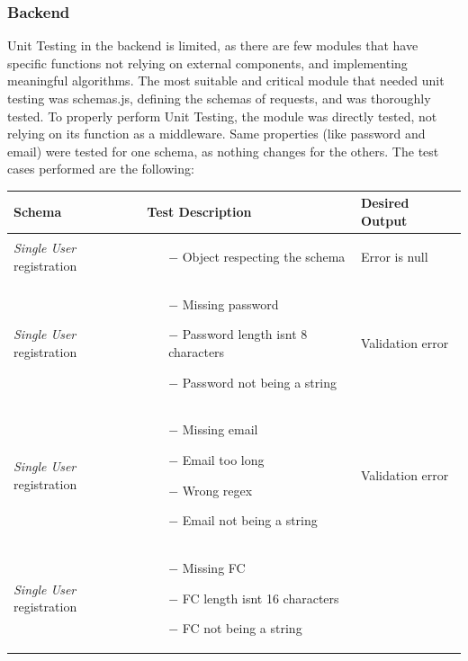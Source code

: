 \documentclass[titlepage]{article}
\begin{document}
	\subsubsection{Backend}
	Unit Testing in the backend is limited, as there are few modules that have specific functions not relying on external components, and implementing meaningful algorithms. 
	The most suitable and critical module that needed unit testing was schemas.js, defining the schemas of requests, and was thoroughly tested. To properly perform Unit Testing, the module was directly tested, not relying on its function as a middleware. 
	Same properties (like password and email) were tested for one schema, as nothing changes for the others. The test cases performed are the following:
	\renewcommand*{\arraystretch}{1.4}
	\begin{longtable}{| p{3 cm} | p{5 cm} | p{3 cm} |} \hline
		{\bf Schema} & {\bf Test Description} & {\bf Desired Output} \\ \hline
		{\it Single User} registration & \begin{itemize}[nolistsep]
			\item[$-$] Object respecting the schema
		\end{itemize}
		& Error is null \\ \hline
		{\it Single User} registration & \begin{itemize}[nolistsep]
			\item[$-$] Missing password
			\item[$-$] Password length isn\textsc{\char13}t 8 characters
			\item[$-$] Password not being a string
		\end{itemize}
		& Validation error \\ \hline
		{\it Single User} registration & \begin{itemize}[nolistsep]
			\item[$-$] Missing email
			\item[$-$] Email too long
			\item[$-$] Wrong regex
			\item[$-$] Email not being a string
		\end{itemize}
		& Validation error \\ \hline
		{\it Single User} registration & \begin{itemize}[nolistsep]
			\item[$-$] Missing FC
			\item[$-$] FC length isn\textsc{\char13}t 16 characters
			\item[$-$] FC not being a string

\end{itemize}
\end{longtable}
\end{document}
